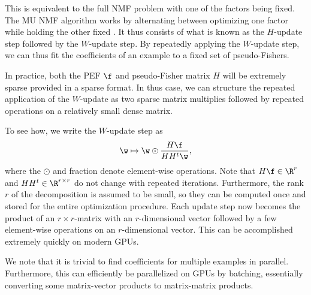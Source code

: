 \documentclass[dvipsnames]{article}
\begin{document}
This is equivalent to the full NMF problem with one of the factors being fixed.
The MU NMF algorithm works by alternating between optimizing one factor while holding the other fixed \citep{boureima2022distributed}.
It thus consists of what is known as the $H$-update step followed by the $W$-update step.
By repeatedly applying the $W$-update step, we can thus fit the coefficients of an example to a fixed set of pseudo-Fishers.

In practice, both the PEF $\f$ and pseudo-Fisher matrix $H$ will be extremely sparse provided in a sparse format.
In thus case, we can structure the repeated application of the $W$-update as two sparse matrix multiplies followed by repeated operations on a relatively small dense matrix.

To see how, we write the $W$-update step as
\begin{equation}\label{eq:appendix_w_update}
    \w \mapsto \w \odot \frac{H\f}{HH^t\w},
\end{equation}
where the $\odot$ and fraction denote element-wise operations.
Note that $H\f \in \R^r$ and $HH^t\in\R^{r\times r}$ do not change with repeated iterations.
Furthermore, the rank $r$ of the decomposition is assumed to be small, so they can be computed once and stored for the entire optimization procedure.
Each update step now becomes the product of an $r\times r$-matrix with an $r$-dimensional vector followed by a few element-wise operations on an $r$-dimensional vector.
This can be accomplished extremely quickly on modern GPUs.

We note that it is trivial to find coefficients for multiple examples in parallel.
Furthermore, this can efficiently be parallelized on GPUs by batching, essentially converting some matrix-vector products to matrix-matrix products.



\end{document}
